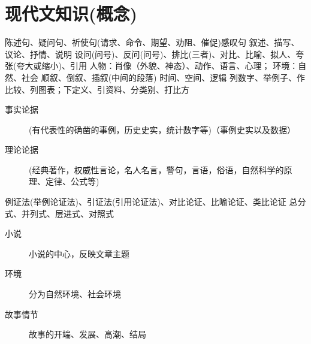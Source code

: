 ﻿%
\tableofcontents
\newpage
{}
\section{现代文知识(概念)}
  陈述句、疑问句、祈使句(请求、命令、期望、劝阻、催促)感叹句
  叙述、描写、议论、抒情、说明
  设问(问号)、反问(问号)、排比(三者)、对比、比喻、拟人、夸张(夸大或缩小)、引用
  人物：肖像（外貌、神态）、动作、语言、心理；
  环境：自然、社会
  顺叙、倒叙、插叙(中间的段落)
  时间、空间、逻辑
列数字、举例子、作比较、列图表；下定义、引资料、分类别、打比方
\begin{description}
\item [事实论据](有代表性的确凿的事例，历史史实，统计数字等)（事例史实以及数据）
\item [理论论据](经典著作，权威性言论，名人名言，警句，言语，俗语，自然科学的原理、定律、公式等)
\end{description}
例证法(举例论证法)、引证法(引用论证法)、对比论证、比喻论证、类比论证
  总分式、并列式、层进式、对照式
\begin{description}
\item[小说]小说的中心，反映文章主题
\item[环境]分为自然环境、社会环境
\item[故事情节]故事的开端、发展、高潮、结局
\end{description}
